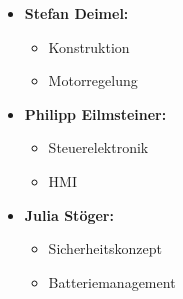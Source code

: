\begin{itemize}
    \item \textbf{Stefan Deimel:}
    \begin{itemize}
      \item Konstruktion
      \item Motorregelung
    \end{itemize}
    \item \textbf{Philipp Eilmsteiner:}
    \begin{itemize}
      \item Steuerelektronik
      \item HMI
    \end{itemize}
    \item \textbf{Julia Stöger:}
    \begin{itemize}
      \item Sicherheitskonzept
      \item Batteriemanagement
    \end{itemize}
  \end{itemize}